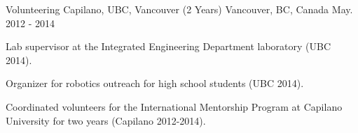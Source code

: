 

\begin{cventries}



  \cventry
    {Volunteering} %
    {Capilano, UBC, Vancouver (2 Years)} %
    {Vancouver, BC, Canada} %
    {May. 2012 - 2014} %
    {
      \begin{cvitems} %
        \item {Lab supervisor at the Integrated Engineering Department laboratory (UBC 2014).}
        \item {Organizer for robotics outreach for high school students (UBC 2014).}
        \item {Coordinated volunteers for the International Mentorship Program at Capilano University for two years (Capilano 2012-2014).}
      \end{cvitems}
    }

\end{cventries}
